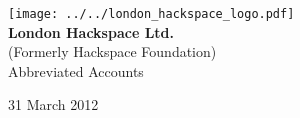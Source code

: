


\begin{titlepage}
\begin{center}
\texttt{[image: ../../london\_hackspace\_logo.pdf]}\\[48pt]
{\bf \LARGE London Hackspace Ltd.}\\[14pt]
(Formerly Hackspace Foundation) \\[36pt]
{\Large Abbreviated Accounts}

\vfill
31 March 2012

\end{center}
\end{titlepage}





